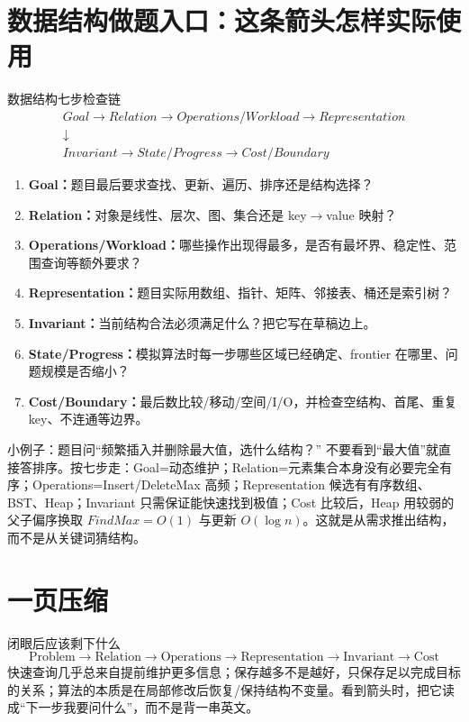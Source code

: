 \documentclass[11pt,a4paper,openany]{ctexbook}
\newcommand{\key}[1]{\textbf{\color{deep}#1}}
\begin{document}
\section{数据结构做题入口：这条箭头怎样实际使用}
\begin{examBox}{数据结构七步检查链}
\[
\boxed{\begin{gathered}
Goal\rightarrow Relation\rightarrow Operations/Workload\rightarrow Representation\\
\downarrow\\
Invariant\rightarrow State/Progress\rightarrow Cost/Boundary
\end{gathered}}
\]
\begin{enumerate}
  \item \key{Goal：}题目最后要求查找、更新、遍历、排序还是结构选择？
  \item \key{Relation：}对象是线性、层次、图、集合还是 key$\to$value 映射？
  \item \key{Operations/Workload：}哪些操作出现得最多，是否有最坏界、稳定性、范围查询等额外要求？
  \item \key{Representation：}题目实际用数组、指针、矩阵、邻接表、桶还是索引树？
  \item \key{Invariant：}当前结构合法必须满足什么？把它写在草稿边上。
  \item \key{State/Progress：}模拟算法时每一步哪些区域已经确定、frontier 在哪里、问题规模是否缩小？
  \item \key{Cost/Boundary：}最后数比较/移动/空间/I/O，并检查空结构、首尾、重复 key、不连通等边界。
\end{enumerate}
\end{examBox}

\begin{methodbox}{小例子：题目问“频繁插入并删除最大值，选什么结构？”}
不要看到“最大值”就直接答排序。按七步走：Goal=动态维护；Relation=元素集合本身没有必要完全有序；Operations=Insert/DeleteMax 高频；Representation 候选有有序数组、BST、Heap；Invariant 只需保证能快速找到极值；Cost 比较后，Heap 用较弱的父子偏序换取 $FindMax=O(1)$ 与更新 $O(\log n)$。这就是从需求推出结构，而不是从关键词猜结构。
\end{methodbox}

\section{一页压缩}
\begin{corebox}{闭眼后应该剩下什么}
\[
\boxed{\text{Problem}\rightarrow\text{Relation}\rightarrow\text{Operations}\rightarrow\text{Representation}\rightarrow\text{Invariant}\rightarrow\text{Cost}}
\]
快速查询几乎总来自提前维护更多信息；保存越多不是越好，只保存足以完成目标的关系；算法的本质是在局部修改后恢复/保持结构不变量。看到箭头时，把它读成“下一步我要问什么”，而不是背一串英文。
\end{corebox}
\end{document}
